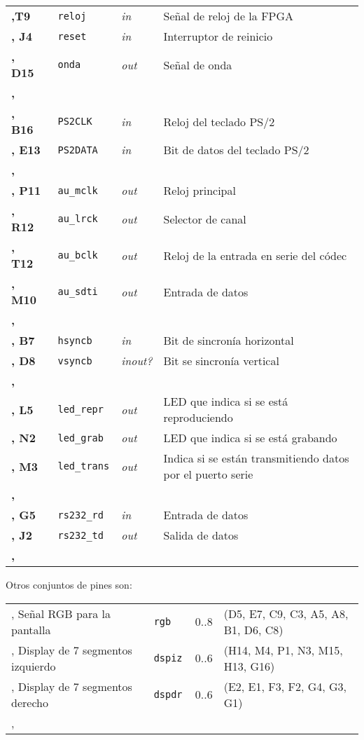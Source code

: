 \documentclass{article}
\begin{document}
\begin{tabu}{|>{\bfseries}X[1, l] | >{\tt}X[2, l] | >{\itshape}X[1, l] |X[10, l] |}
	\sep T9 & reloj & in & Señal de reloj de la FPGA \\ \sep
	J4 & reset & in & Interruptor de reinicio \\ \sep
	D15 & onda & out & Señal de onda \\ \sep

	 \\ \sep	
	B16 & PS2CLK & in & Reloj del teclado PS/2 \\ \sep
	E13 & PS2DATA & in & Bit de datos del teclado PS/2 \\ \sep
	
	 \\ \sep
	P11 & au\_mclk & out & Reloj principal \\ \sep
	R12 & au\_lrck & out & Selector de canal \\ \sep
	T12 & au\_bclk & out & Reloj de la entrada en serie del códec \\ \sep
	M10 & au\_sdti & out & Entrada de datos \\ \sep

	 \\ \sep
	B7 & hsyncb & in & Bit de sincronía horizontal \\ \sep
	D8 & vsyncb & inout? & Bit se sincronía vertical \\ \sep

	 \\ \sep
	L5 & led\_repr & out & LED que indica si se está reproduciendo \\ \sep
	N2 & led\_grab & out & LED que indica si se está grabando \\ \sep
	M3 & led\_trans & out & Indica si se están transmitiendo datos por el puerto serie \\ \sep

	 \\ \sep
	G5 & rs232\_rd & in & Entrada de datos \\ \sep
	J2 & rs232\_td & out & Salida de datos \\ \sep
\end{tabu}

	\bigskip Otros conjuntos de pines son:

\medskip \begin{tabu}{| X[5, l] | >{\tt}X[1,l] | X[1, l] | X[5, l] |}
	\sep
	Señal RGB para la pantalla & rgb & 0..8 & (D5, E7, C9, C3, A5, A8, B1, D6, C8) \\ \sep
	Display de 7 segmentos izquierdo & dspiz & 0..6 & (H14, M4, P1, N3, M15, H13, G16) \\ \sep
	Display de 7 segmentos derecho & dspdr & 0..6 & (E2, E1, F3, F2, G4, G3, G1) \\ \sep
\end{tabu} 
\end{document}
